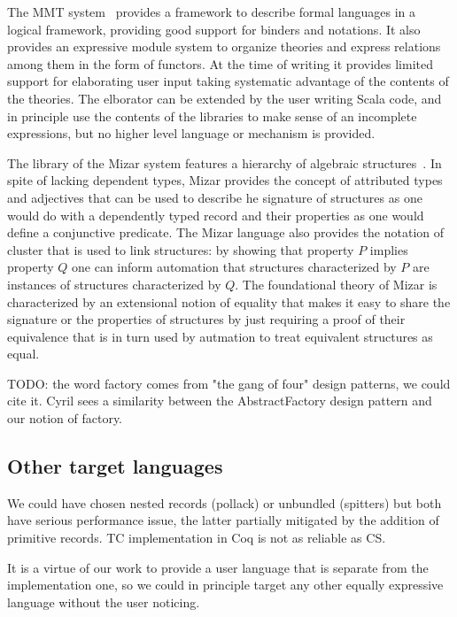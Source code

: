 \documentclass[a4paper,UKenglish,cleveref, autoref]{lipics-v2019}
\begin{document}
{{The MMT system~\cite{RABE20131} provides a framework to describe formal
languages in a logical framework, providing good support for binders and
notations. It also provides an expressive module system to organize
theories and express relations among them in the form of functors.
At the time of writing
it provides limited support for elaborating user input taking systematic
advantage of the contents of the theories. The elborator can be extended
by the user writing Scala code, and in principle use the contents of the
libraries to make sense of an incomplete expressions, but no higher level
language or mechanism is provided.

The library of the Mizar system features a hierarchy of algebraic
structures~\cite{7733265}. In spite of lacking dependent types, Mizar
provides the concept of attributed types and adjectives
that can be used to describe he signature of structures as one would
do with a dependently typed record and their properties as
one would define a conjunctive predicate.
The Mizar language also provides the notation of cluster that is used
to link structures: by showing that property $P$ implies property $Q$
one can inform automation that structures characterized by $P$ are
instances of structures characterized by $Q$. The foundational theory of Mizar
is characterized by an extensional notion of equality that makes it easy
to share the signature or the properties of structures by just requiring
a proof of their equivalence that is in turn used by autmation to treat
equivalent structures as equal.

TODO: the word factory comes from "the gang of four" design patterns, we
could cite it. Cyril sees a similarity between the AbstractFactory design
pattern and our notion of factory.

\subsection{Other target languages}

We could have chosen nested records (pollack) or unbundled (spitters)
but both have serious performance issue, the latter partially mitigated by
the addition of primitive records. TC implementation in Coq is not as
reliable as CS.

It is a virtue of our work to provide a user language that is separate
from the implementation one, so we could in principle target any other
equally expressive language without the user noticing.

}}
\end{document}
